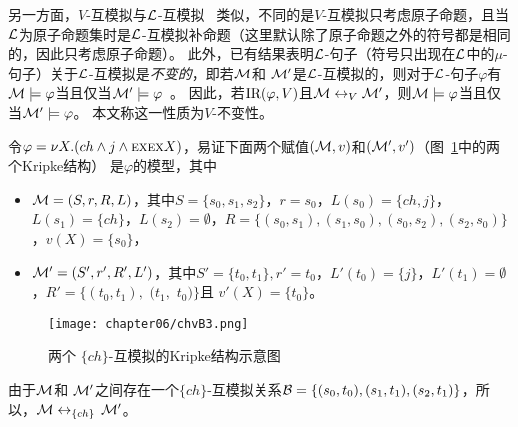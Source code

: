 另一方面，$V$-互模拟与${\cal L}$-互模拟
~\cite{d1996uniform}类似，不同的是$V$-互模拟只考虑原子命题，且当${\cal L}$为原子命题集时是${\cal L}$-互模拟补命题（这里默认除了原子命题之外的符号都是相同的，因此只考虑原子命题）。
此外，已有结果表明${\cal L}$-句子（符号只出现在${\cal L}$中的$\mu$-句子）关于${\cal L}$-互模拟是{\em 不变的}，即若${\cal M}$和 ${\cal M}'$是${\cal L}$-互模拟的，则对于${\cal L}$-句子$\varphi$有${\cal M} \models \varphi$当且仅当${\cal M}' \models \varphi$~\cite{d1996uniform,bradfield2018mu}。
因此，若$\textrm{IR}(\varphi, V)$且${\cal M} \leftrightarrow_V {\cal M}'$，则${\cal M} \models \varphi$当且仅当${\cal M}' \models \varphi$。
本文称这一性质为$V$-不变性。
\begin{example}\label{exmp:c06:bisim}
	 令$\varphi= \nu X.( ch \wedge j \wedge  \textsc{e} \textsc{x} \textsc{e} \textsc{x} X)$，易证下面两个赋值$({\cal M},v)$和$({\cal M}',v')$（图~\ref{chapter06:fig:bisim}中的两个Kripke结构）
	 是$\varphi$的模型，其中
	\begin{itemize}
		\item ${\cal M}=(S,r,R,L)$，其中$S=\{s_0,s_1,s_2\}$，$r=s_0$，$L(s_0)=\{ch, j\}$，$L(s_1)=\{ch\}$，$L(s_2)=\emptyset$，$R=\{(s_0,s_1), (s_1,s_0), (s_0,s_2), (s_2,s_0)\}$，$v(X)=\{s_0\}$，
		\item  ${\cal M}'=(S',r',R',L')$，其中$S'=\{t_0,t_1\}, r'=t_0$，$L'(t_0)=\{j\}$，$L'(t_1)=\emptyset$，$R'=\{(t_0,t_1),$ $(t_1,$ $t_0)\}$且
		$v'(X)=\{t_0\}$。
	\end{itemize} 
	
		\begin{figure}[h]%
		\centering
		\texttt{[image: chapter06/chvB3.png]}
		\caption{两个 $\{ch\}$-互模拟的Kripke结构示意图}\label{chapter06:fig:bisim}
		
	\end{figure}
	
	由于${\cal M}$和 ${\cal M}'$之间存在一个$\{ch\}$-互模拟关系${\cal B}=\{(s_0, t_0), (s_1, t_1), (s_2, t_1)\}$，所以，${\cal M} \leftrightarrow_{\{ch\}}$ ${\cal M}'$。
\end{example}
